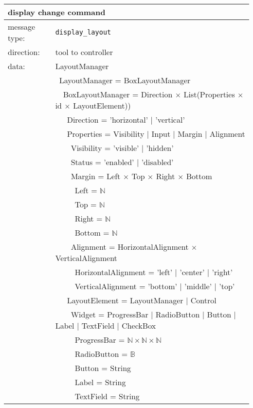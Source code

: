\documentclass{article}
\newcommand{\msg}[1]{\texttt{#1}}
\begin{document}
   \begin{table}[H]
    \begin{center}
     \begin{tabular}{|ll|}
      \hline
       \multicolumn{2}{|l|}{\textbf{display change command}} \\
      \hline
       message type:   & \msg{display\_layout} \\
      \hline
       direction:      & tool to controller \\
       data:           & LayoutManager \\
                       & \ LayoutManager = BoxLayoutManager \\
                       & \ \ BoxLayoutManager = Direction $\times$ List(Properties $\times$ id $\times$ LayoutElement)) \\
                       & \ \ \ Direction = 'horizontal' $|$ 'vertical' \\
                       & \ \ \ Properties = Visibility $|$ Input $|$ Margin $|$ Alignment \\
                       & \ \ \ \ Visibility = 'visible' $|$ 'hidden' \\
                       & \ \ \ \ Status = 'enabled' $|$ 'disabled' \\
                       & \ \ \ \ Margin = Left $\times$ Top $\times$ Right $\times$ Bottom \\
                       & \ \ \ \ \ Left   = $\mathbb{N}$ \\
                       & \ \ \ \ \ Top    = $\mathbb{N}$ \\
                       & \ \ \ \ \ Right  = $\mathbb{N}$ \\
                       & \ \ \ \ \ Bottom = $\mathbb{N}$ \\
                       & \ \ \ \ Alignment = HorizontalAlignment $\times$ VerticalAlignment \\
                       & \ \ \ \ \ HorizontalAlignment = 'left' $|$ 'center' $|$ 'right' \\
                       & \ \ \ \ \ VerticalAlignment = 'bottom' $|$ 'middle' $|$ 'top' \\
                       & \ \ \ LayoutElement = LayoutManager $|$ Control \\
                       & \ \ \ \ Widget = ProgressBar $|$ RadioButton $|$ Button $|$ Label $|$ TextField $|$ CheckBox \\
                       & \ \ \ \ \ ProgressBar = $\mathbb{N} \times \mathbb{N} \times \mathbb{N}$ \\
                       & \ \ \ \ \ RadioButton = $\mathbb{B}$ \\
                       & \ \ \ \ \ Button      = String \\
                       & \ \ \ \ \ Label       = String \\
                       & \ \ \ \ \ TextField   = String \\
      \hline
     \end{tabular}
    \end{center}
   \end{table}
\end{document}
